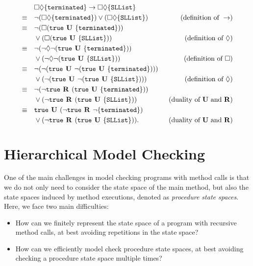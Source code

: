 \documentclass[a4paper, 12pt, twoside]{report}
\begin{document}
	\begin{align*}
		&\square \lozenge \{\texttt{terminated}\} \rightarrow \square \lozenge \{\texttt{SLList}\} \\
		\equiv \quad &\neg(\square \lozenge \{\texttt{terminated}\}) \vee (\square \lozenge \{\texttt{SLList}\}) \qquad &(\text{definition of } \rightarrow) \\
		\equiv \quad &\neg(\square (\text{\texttt{true}} \text{\textbf{ U }} \{\texttt{terminated}\})) \\&\vee (\square (\text{\texttt{true}} \text{\textbf{ U }} \{\texttt{SLList}\})) \qquad &(\text{definition of } \lozenge) \\
		\equiv \quad &\neg(\neg\lozenge\neg (\text{\texttt{true}} \text{\textbf{ U }} \{\texttt{terminated}\}))\\ &\vee (\neg\lozenge\neg (\text{\texttt{true}} \text{\textbf{ U }} \{\texttt{SLList}\})) \qquad &(\text{definition of } \square) \\
		\equiv \quad &\neg(\neg(\text{\texttt{true}}  \text{\textbf{ U }} \neg (\text{\texttt{true}} \text{\textbf{ U }} \{\texttt{terminated}\})))\\ &\vee (\neg(\text{\texttt{true}} \text{\textbf{ U }} \neg (\text{\texttt{true}} \text{\textbf{ U }} \{\texttt{SLList}\}))) \qquad &(\text{definition of } \lozenge) \\
		\equiv \quad &\neg(\neg\text{\texttt{true}}  \text{\textbf{ R }} (\text{\texttt{true}} \text{\textbf{ U }} \{\texttt{terminated}\}))\\ &\vee (\neg\text{\texttt{true}} \text{\textbf{ R }} (\text{\texttt{true}} \text{\textbf{ U }} \{\texttt{SLList}\})) \qquad &(\text{duality of } \text{\textbf{U}} \text{ and } \text{\textbf{R}}) \\
		\equiv \quad &\text{\texttt{true}}  \text{\textbf{ U }} (\neg\text{\texttt{true}} \text{\textbf{ R }} \neg\{\texttt{terminated}\}) \\&\vee (\neg\text{\texttt{true}} \text{\textbf{ R }} (\text{\texttt{true}} \text{\textbf{ U }} \{\texttt{SLList}\})). \qquad &(\text{duality of } \text{\textbf{U}} \text{  and } \text{\textbf{R}}) \\
	\end{align*}	
	
	\chapter{Hierarchical Model Checking}
	
	One of the main challenges in model checking programs with method calls is that we do not only need to consider the state space of the main method, but also the state spaces induced by method executions, denoted as \textit{procedure state spaces}. Here, we face two main difficulties:
	\begin{itemize}
		\item How can we finitely represent the state space of a program with recursive method calls, at best avoiding repetitions in the state space?
		\item How can we efficiently model check procedure state spaces, at best avoiding checking a procedure state space multiple times? 
	\end{itemize}
	
\end{document}

